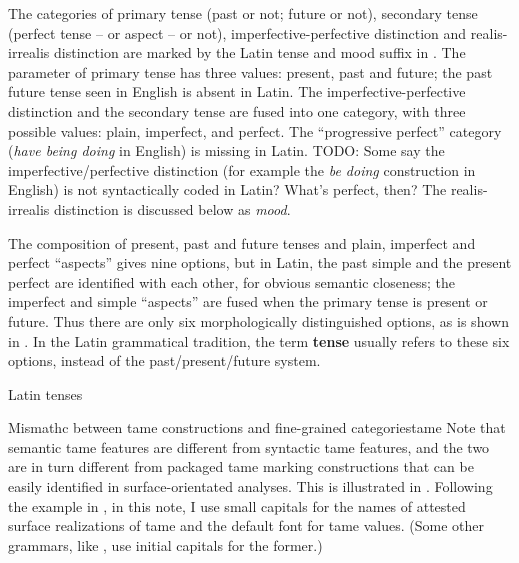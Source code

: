 \documentclass[a4paper, oneside, 12pt]{report}
\newcommand*{\concept}[1]{\textbf{#1}}
\newcommand{\form}[1]{\emph{#1}}
\begin{document}
The categories of primary tense (past or not; future or not),
secondary tense (perfect tense -- or aspect -- or not),
imperfective-perfective distinction 
and realis-irrealis distinction 
are marked by the Latin tense and mood suffix in .
The parameter of primary tense has three values: 
present, past and future;
the past future tense seen in English 
is absent in Latin.
The imperfective-perfective distinction and the secondary tense 
are fused into one category,
with three possible values: 
plain, imperfect, and perfect. 
The ``progressive perfect'' category (\form{have being doing} in English)
is missing in Latin.
TODO: Some say the imperfective/perfective distinction 
(for example the \form{be doing} construction in English)
is not syntactically coded in Latin?
What's perfect, then?
The realis-irrealis distinction is discussed below as \emph{mood}.

The composition of present, past and future tenses
and plain, imperfect and perfect ``aspects''
gives nine options,
but in Latin, 
the past simple and the present perfect are identified with each other,
for obvious semantic closeness;
the imperfect and simple ``aspects'' are fused 
when the primary tense is present or future.
Thus there are only six morphologically distinguished options,
as is shown in . 
In the Latin grammatical tradition, 
the term \concept{tense} 
usually refers to these six options,
instead of the past/present/future system.


\begin{table}[H]
    \caption{Latin tenses}
    \label{tbl:latin-tense-aspect}
    \centering
        
\end{table}

\begin{infobox}{Mismathc between \ac{tame} constructions and fine-grained categories}{tame}
    Note that semantic \ac{tame} features are different from 
    syntactic \ac{tame} features,
    and the two are in turn different from packaged \ac{tame} marking constructions
    that can be easily identified in surface-orientated analyses.
    This is illustrated in .
    Following the example in \citet{grimm2021grammar},
    in this note, I use small capitals for the names of attested surface realizations of \ac{tame}
    and the default font for \ac{tame} values.
    (Some other grammars, like \citet{jacques2021grammar,friesen2017grammar}, 
    use initial capitals for the former.)
\end{infobox}
\end{document}
